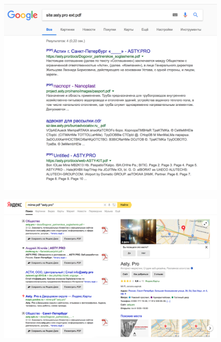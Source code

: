 \begin{figure}[ht]
	\centering
	\label{docs}
	\includegraphics[width=\textwidth]{images/3.png}
	\caption{}
\end{figure}


\begin{figure}[ht]
	\centering
	\label{mime_pdf}
	\includegraphics[width=\textwidth]{images/mime_pdf.png}
	\caption{}
\end{figure}



